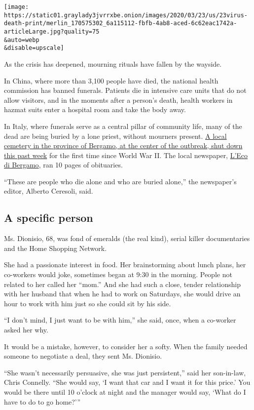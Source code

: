 \texttt{[image: https://static01.graylady3jvrrxbe.onion/images/2020/03/23/us/23virus-death-print/merlin\_170575302\_6a115112-fbfb-4ab8-aced-6c62eac1742a-articleLarge.jpg?quality=75\\\&auto=webp\\\&disable=upscale]}

As the crisis has deepened, mourning rituals have fallen by the wayside.

In China, where more than 3,100 people have died, the national health
commission has banned funerals. Patients die in intensive care units
that do not allow visitors, and in the moments after a person's death,
health workers in hazmat suits enter a hospital room and take the body
away.

In Italy, where funerals serve as a central pillar of community life,
many of the dead are being buried by a lone priest, without mourners
present.
\href{https://www.nytimes3xbfgragh.onion/2020/03/16/world/europe/italy-coronavirus-funerals.html}{A
local cemetery in the province of Bergamo, at the center of the
outbreak, shut down this past week} for the first time since World War
II. The local newspaper, \href{https://www.ecodibergamo.it/}{L'Eco di
Bergamo}, ran 10 pages of obituaries.

``These are people who die alone and who are buried alone,'' the
newspaper's editor, Alberto Ceresoli, said.

\hypertarget{a-specific-person}{%
\subsection{A specific person}\label{a-specific-person}}

Ms. Dionisio, 68, was fond of emeralds (the real kind), serial killer
documentaries and the Home Shopping Network.

She had a passionate interest in food. Her brainstorming about lunch
plans, her co-workers would joke, sometimes began at 9:30 in the
morning. People not related to her called her ``mom.'' And she had such
a close, tender relationship with her husband that when he had to work
on Saturdays, she would drive an hour to work with him just so she could
sit by his side.

``I don't mind, I just want to be with him,'' she said, once, when a
co-worker asked her why.

It would be a mistake, however, to consider her a softy. When the family
needed someone to negotiate a deal, they sent Ms. Dionisio.

``She wasn't necessarily persuasive, she was just persistent,'' said her
son-in-law, Chris Connelly. ``She would say, `I want that car and I want
it for this price.' You would be there until 10 o'clock at night and the
manager would say, `What do I have to do to go home?'''

